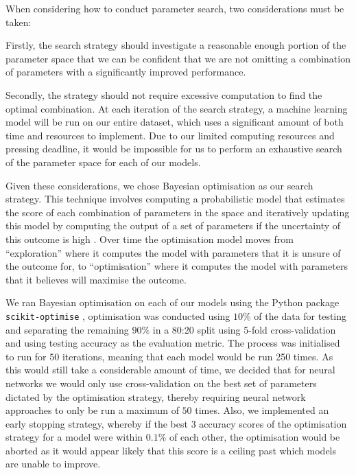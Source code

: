 \documentclass[journal, ]{IEEEtran}
\begin{document}
When considering how to conduct parameter search, two considerations must be taken:

Firstly, the search strategy should investigate a reasonable enough portion of the parameter space that we can be confident that we are not omitting a combination of parameters with a significantly improved performance.

Secondly, the strategy should not require excessive computation to find the optimal combination. At each iteration of the search strategy, a machine learning model will be run on our entire dataset, which uses a significant amount of both time and resources to implement. Due to our limited computing resources and pressing deadline, it would be impossible for us to perform an exhaustive search of the parameter space for each of our models.

Given these considerations, we chose Bayesian optimisation as our search strategy. This technique involves computing a probabilistic model that estimates the score of each combination of parameters in the space and iteratively updating this model by computing the output of a set of parameters if the uncertainty of this outcome is high \cite{shahriari2015taking}. Over time the optimisation model moves from “exploration” where it computes the model with parameters that it is unsure of the outcome for, to “optimisation” where it computes the model with parameters that it believes will maximise the outcome.

We ran Bayesian optimisation on each of our models using the Python package \texttt{scikit-optimise} \cite{skopt}, optimisation was conducted using $10\%$ of the data for testing and separating the remaining $90\%$ in a 80:20 split using 5-fold cross-validation and using testing accuracy as the evaluation metric. The process was initialised to run for $50$ iterations, meaning that each model would be run 250 times. As this would still take a considerable amount of time, we decided that for neural networks we would only use cross-validation on the best set of parameters dictated by the optimisation strategy, thereby requiring neural network approaches to only be run a maximum of $50$ times. Also, we implemented an early stopping strategy, whereby if the best $3$ accuracy scores of the optimisation strategy for a model were within $0.1\%$ of each other, the optimisation would be aborted as it would appear likely that this score is a ceiling past which models are unable to improve.
\end{document}
